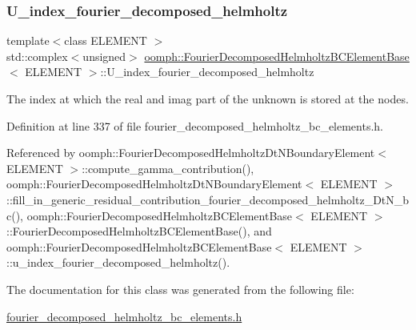 \subsubsection{\texorpdfstring{U\+\_\+index\+\_\+fourier\+\_\+decomposed\+\_\+helmholtz}{U\_index\_fourier\_decomposed\_helmholtz}}
{\footnotesize\ttfamily template$<$class E\+L\+E\+M\+E\+NT $>$ \\
std\+::complex$<$unsigned$>$ \hyperlink{classoomph_1_1FourierDecomposedHelmholtzBCElementBase}{oomph\+::\+Fourier\+Decomposed\+Helmholtz\+B\+C\+Element\+Base}$<$ E\+L\+E\+M\+E\+NT $>$\+::U\+\_\+index\+\_\+fourier\+\_\+decomposed\+\_\+helmholtz\hspace{0.3cm}{\ttfamily [protected]}}



The index at which the real and imag part of the unknown is stored at the nodes. 



Definition at line 337 of file fourier\+\_\+decomposed\+\_\+helmholtz\+\_\+bc\+\_\+elements.\+h.



Referenced by oomph\+::\+Fourier\+Decomposed\+Helmholtz\+Dt\+N\+Boundary\+Element$<$ E\+L\+E\+M\+E\+N\+T $>$\+::compute\+\_\+gamma\+\_\+contribution(), oomph\+::\+Fourier\+Decomposed\+Helmholtz\+Dt\+N\+Boundary\+Element$<$ E\+L\+E\+M\+E\+N\+T $>$\+::fill\+\_\+in\+\_\+generic\+\_\+residual\+\_\+contribution\+\_\+fourier\+\_\+decomposed\+\_\+helmholtz\+\_\+\+Dt\+N\+\_\+bc(), oomph\+::\+Fourier\+Decomposed\+Helmholtz\+B\+C\+Element\+Base$<$ E\+L\+E\+M\+E\+N\+T $>$\+::\+Fourier\+Decomposed\+Helmholtz\+B\+C\+Element\+Base(), and oomph\+::\+Fourier\+Decomposed\+Helmholtz\+B\+C\+Element\+Base$<$ E\+L\+E\+M\+E\+N\+T $>$\+::u\+\_\+index\+\_\+fourier\+\_\+decomposed\+\_\+helmholtz().



The documentation for this class was generated from the following file\+:\begin{DoxyCompactItemize}
\item 
\hyperlink{fourier__decomposed__helmholtz__bc__elements_8h}{fourier\+\_\+decomposed\+\_\+helmholtz\+\_\+bc\+\_\+elements.\+h}\end{DoxyCompactItemize}
